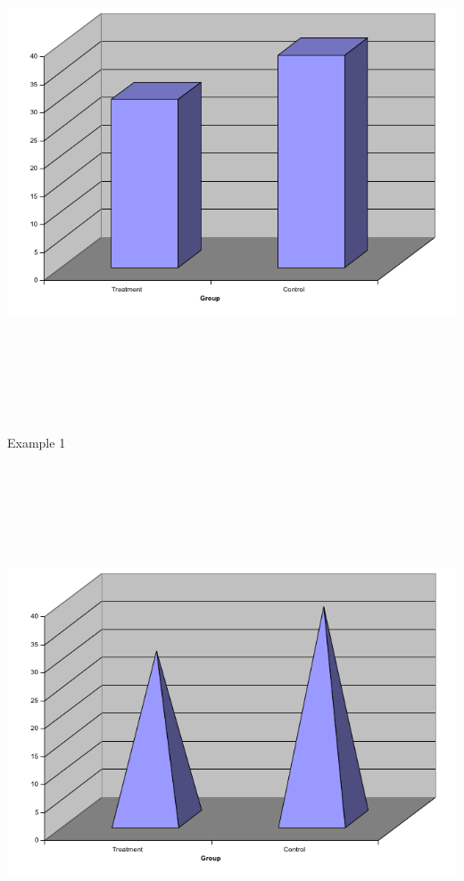 \documentclass[12pt]{article}
\newcommand{\headsize}{\fontsize{35}{35} \selectfont}
\begin{document}
\centerline{\includegraphics[height=6in]{Figs/fig1e.png}}


\newpage


\headsize \color{yellow}
\hfill \begin{minipage}{5.75in}
\centering
Example 1
\end{minipage}

\vspace{30mm}

\centerline{\includegraphics[height=6in]{Figs/fig1f.png}}
\end{document}
